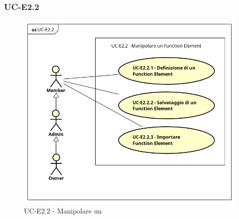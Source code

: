 \subsubsection{UC-E2.2}
    \begin{figure}[H]
      \begin{center}
        \includegraphics[width=12cm]{res/img/UCEditor/UC-E2.2.png}
      \caption{UC-E2.2 - Manipolare un }
      \end{center} 
    \end{figure}


